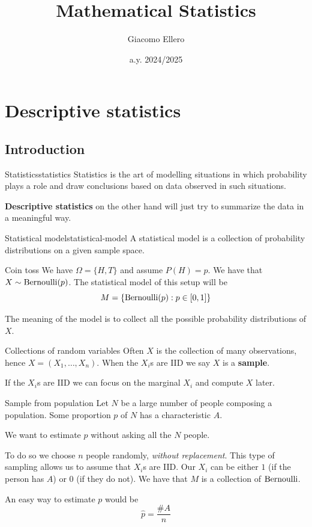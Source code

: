 \documentclass[12pt]{extarticle}
\title{Mathematical Statistics}
\author{Giacomo Ellero}
\date{a.y. 2024/2025}
\newcommand{\Bernoulli}{{\operatorfont Bernoulli}}
\begin{document}
\firstpage

\section{Descriptive statistics}

\subsection{Introduction}

\begin{definition}{Statistics}{statistics}
    Statistics is the art of modelling situations in which probability plays a role and draw conclusions based on data observed in such situations.
\end{definition}

\textbf{Descriptive statistics} on the other hand will just try to summarize the data in a meaningful way.

\begin{definition}{Statistical model}{statistical-model}
    A statistical model is a collection of probability distributions on a given sample space.
\end{definition}

\begin{example}{Coin toss}
    We have $\Omega = \{ H, T \}$ and assume $P(H) = p$. We have that $X \sim \Bernoulli(p)$. The statistical model of this setup will be
    \begin{equation}
        M = \{ \Bernoulli(p) : p \in [0, 1] \}
    \end{equation}
\end{example}

The meaning of the model is to collect all the possible probability distributions of $X$.

\begin{remark}{Collections of random variables}{}
    Often $X$ is the collection of many observations, hence $X = (X_1, \dots, X_n)$.
    When the $X_i$s are IID we say $X$ is a \textbf{sample}.
\end{remark}

If the $X_i$s are IID we can focus on the marginal $X_i$ and compute $X$ later.

\begin{example}{Sample from population}{}
    Let $N$ be a large number of people composing a population.
    Some proportion $p$ of $N$ has a characteristic $A$.

    We want to estimate $p$ without asking all the $N$ people.

    To do so we choose $n$ people randomly, \textit{without replacement}.
    This type of sampling allows us to assume that $X_i$s are IID.
    Our $X_i$ can be either $1$ (if the person has $A$) or $0$ (if they do not).
    We have that $M$ is a collection of $\Bernoulli$.

    An easy way to estimate $p$ would be
    \begin{equation}
        \hat p = \frac{\# A}{n}
    \end{equation}
\end{example}
\end{document}
